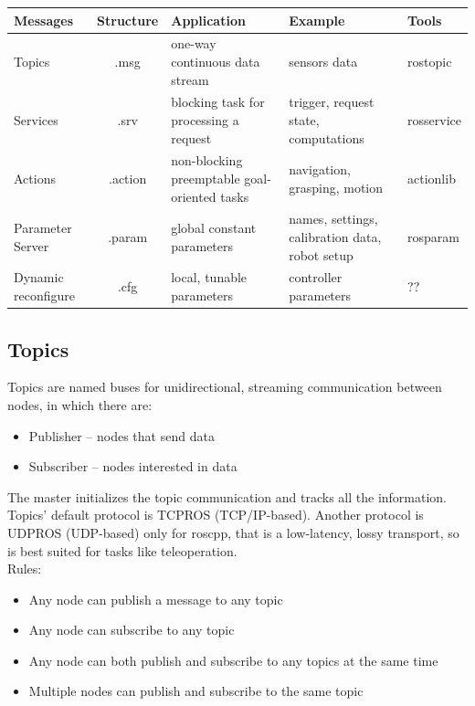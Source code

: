         \begin{tabular}[c]{ |p{2.5cm}||c|p{4cm}|p{3cm}|p{2cm}| }
            \hline
            Messages & Structure  & Application & Example & Tools \\
            \hline
            \hline
            Topics & .msg & one-way continuous data stream & sensors data & rostopic \\
            \hline
            Services & .srv & blocking task for processing a request & trigger, request state, computations & rosservice \\
            \hline
            Actions & .action & non-blocking preemptable goal-oriented tasks & navigation, grasping, motion & actionlib \\
            \hline
            Parameter Server & .param & global constant parameters & names, settings, calibration data, robot setup & rosparam \\
            \hline
            Dynamic reconfigure & .cfg & local, tunable parameters & controller parameters & ?? \\
            \hline
        \end{tabular}


        \subsection{Topics}
            Topics are named buses for unidirectional, streaming communication between nodes, in which there are:
            \begin{itemize}
                \item Publisher – nodes that send data
                \item Subscriber – nodes interested in data
            \end{itemize}
            The master initializes the topic communication and tracks all the information.
            Topics’ default protocol is TCPROS (TCP/IP-based). Another protocol is UDPROS (UDP-based) only for roscpp, that is a low-latency, lossy transport, so is best suited for tasks like teleoperation.
            \\
            Rules:
            \begin{itemize}
                \item Any node can publish a message to any topic
                \item Any node can subscribe to any topic 
                \item Any node can both publish and subscribe to any topics at the same time
                \item Multiple nodes can publish and subscribe to the same topic
            \end{itemize}




